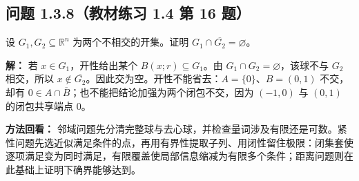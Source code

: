 \documentclass[11pt,a4paper]{article}
\begin{document}
\subsection{问题 1.3.8（教材练习 1.4 第 16
题）}\label{ux95eeux9898-1.3.8ux6559ux6750ux7ec3ux4e60-1.4-ux7b2c-16-ux9898}

设 \(G_1,G_2\subseteq\mathbb R^n\) 为两个不相交的开集。证明
\(G_1\cap\overline{G_2}=\varnothing\)。

\textbf{解：} 若 \(x\in G_1\)，开性给出某个 \(B(x;r)\subseteq G_1\)。由
\(G_1\cap G_2=\varnothing\)，该球不与 \(G_2\) 相交，所以
\(x\notin\overline{G_2}\)。因此交为空。开性不能省去：\(A=\{0\}\)、\(B=(0,1)\)
不交，却有
\(0\in A\cap\overline B\)；也不能把结论加强为两个闭包不交，因为
\((-1,0)\) 与 \((0,1)\) 的闭包共享端点 \(0\)。

\textbf{方法回看：}
邻域问题先分清完整球与去心球，并检查量词涉及有限还是可数。紧性问题先选近似满足条件的点，再用有界性提取子列、用闭性留住极限：闭集套使逐项满足变为同时满足，有限覆盖使局部信息缩减为有限多个条件；距离问题则在此基础上证明下确界能够达到。
\end{document}

